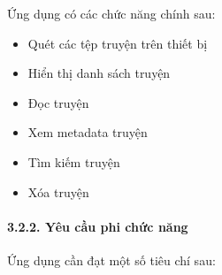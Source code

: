 Ứng dụng có các chức năng chính sau:

\begin{itemize}
  
  \item
        Quét các tệp truyện trên thiết bị
  \item
        Hiển thị danh sách truyện
  \item
        Đọc truyện
  \item
        Xem metadata truyện
  \item
        Tìm kiếm truyện
  \item
        Xóa truyện
\end{itemize}

\hypertarget{yuxeau-cux1ea7u-phi-chux1ee9c-nux103ng}{%
  \paragraph{\texorpdfstring{3.2.2. Yêu cầu phi chức năng
    }{3.2.2. Yêu cầu phi chức năng }}\label{yuxeau-cux1ea7u-phi-chux1ee9c-nux103ng}}

Ứng dụng cần đạt một số tiêu chí sau:

